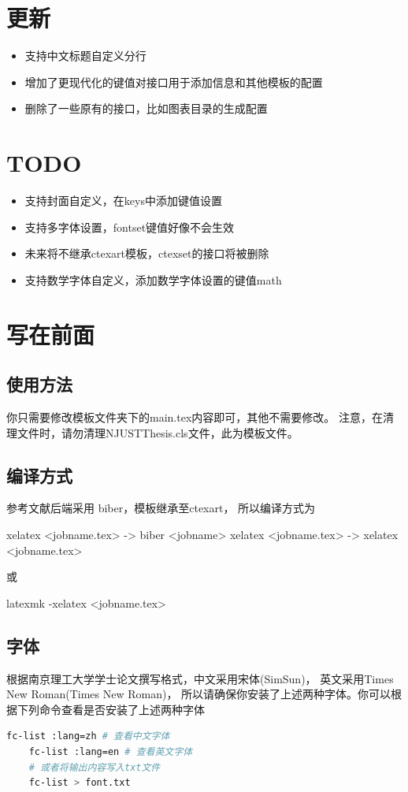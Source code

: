 
\section{更新}
\begin{itemize}
  \item 支持中文标题自定义分行
  \item 增加了更现代化的键值对接口用于添加信息和其他模板的配置
  \item 删除了一些原有的接口，比如图表目录的生成配置
\end{itemize}
\section {TODO}
\begin{itemize}
  \item 支持封面自定义，在keys中添加键值设置
  \item 支持多字体设置，{\ttfamily fontset}键值好像不会生效
  \item 未来将不继承{\ttfamily ctexart}模板，{\ttfamily ctexset}的接口将被删除
  \item 支持数学字体自定义，添加数学字体设置的键值{\ttfamily math}
\end{itemize}

\section{写在前面}
\subsection{使用方法}
你只需要修改模板文件夹下的{\ttfamily main.tex}内容即可，其他不需要修改。
{\color{red} 注意，在清理文件时，请勿清理{\ttfamily NJUSTThesis.cls}文件，此为模板文件。}
\subsection{编译方式}
参考文献后端采用 {\ttfamily biber}，模板继承至{\ttfamily ctexart}，
所以编译方式为

{\ttfamily xelatex <jobname.tex> -> biber <jobname> xelatex <jobname.tex> 
-> xelatex <jobname.tex>}

或

{\ttfamily latexmk -xelatex <jobname.tex>}

\subsection{字体}
根据南京理工大学学士论文撰写格式，中文采用宋体({\ttfamily SimSun})，
英文采用Times New Roman({Times New Roman})，
所以请确保你安装了上述两种字体。你可以根据下列命令查看是否安装了上述两种字体
\begin{lstlisting}[language=bash]
    fc-list :lang=zh # 查看中文字体
    fc-list :lang=en # 查看英文字体
    # 或者将输出内容写入txt文件
    fc-list > font.txt 
\end{lstlisting}

